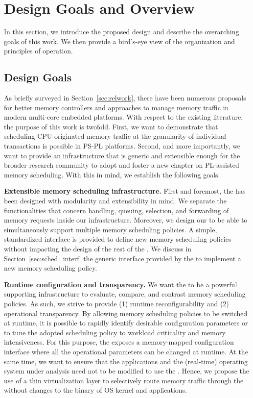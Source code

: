 \section{Design Goals and Overview}\label{sec:overview}

In this section, we introduce the proposed \schim design and describe
the overarching goals of this work. We then provide a bird's-eye view
of the \schim organization and principles of operation.

\subsection{Design Goals}\label{sec:design_goals}
As briefly surveyed in Section~\ref{sec:relwork}, there have been
numerous proposals for better memory controllers and approaches to
manage memory traffic in modern multi-core embedded platforms. With
respect to the existing literature, the purpose of this work is
twofold. First, we want to demonstrate that scheduling CPU-originated
memory traffic at the granularity of individual transactions is
possible in PS-PL platforms. Second, and more importantly, we want to
provide an infrastructure that is generic and extensible enough for
the broader research community to adopt and foster a new chapter on
PL-assisted memory scheduling. With this in mind, we establish the
following goals.

\par{\bf Extensible memory scheduling infrastructure.} First and
foremost, the \schim has been designed with modularity and
extensibility in mind. We separate the functionalities that concern
handling, queuing, selection, and forwarding of memory requests inside
our infrastructure. Moreover, we design our \schim to be able to
simultaneously support multiple memory scheduling policies. A simple,
standardized interface is provided to define new memory scheduling
policies without impacting the design of the rest of the \schim. We
discuss in Section~\ref{sec:sched_interf} the generic interface
provided by the \schim to implement a new memory scheduling policy.

\par{\bf Runtime configuration and transparency.} We want the \schim
to be a powerful supporting infrastructure to evaluate, compare, and
contrast memory scheduling policies. As such, we strive to provide (1)
runtime reconfigurability and (2) operational transparency. By
allowing memory scheduling policies to be switched at runtime, it is
possible to rapidly identify desirable configuration parameters or to
tune the adopted scheduling policy to workload criticality and memory
intensiveness. For this purpose, the \schim exposes a memory-mapped
configuration interface where all the operational parameters can be
changed at runtime. At the same time, we want to ensure that the
applications and the (real-time) operating system under analysis need
not to be modified to use the \schim. Hence, we propose the use of a
thin virtualization layer to selectively route memory traffic through
the \schim without changes to the binary of OS kernel and
applications.

